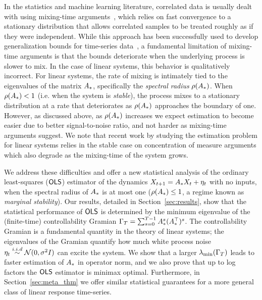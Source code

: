 In the statistics and machine learning literature, correlated data is usually
dealt with using mixing-time arguments~\citep{yu94}, which relies
on fast convergence to a stationary distribution that
allows correlated
samples to be treated roughly as if they were independent.  While this approach has
been successfully used to develop generalization bounds for time-series
data~\citep{mohri07}, a fundamental limitation of mixing-time arguments is that
the bounds deteriorate when the underlying process is slower to mix. 
%
In the case of linear systems, this behavior is qualitatively incorrect.
%
For linear systems, the rate of mixing is intimately tied to 
the eigenvalues of the matrix $A_{*}$, specifically the \emph{spectral radius} $\rho(A_{*})$.
When $\rho(A_{*}) < 1$ (i.e. when the system is \emph{stable}), 
the process mixes to a stationary distribution at a rate that 
deteriorates as $\rho(A_{*})$ approaches the boundary of one.
%
However, as discussed above, as $\rho(A_{*})$ increases
we expect estimation to become easier 
due to better signal-to-noise ratio, and not harder as mixing-time arguments suggest. 
%
%
We note that recent work by \cite{faradonbeh17a} studying the estimation
problem for linear systems relies in the stable case
on concentration of measure arguments which also degrade as the mixing-time of the
system grows.
 
We address these difficulties and offer a new statistical analysis of the ordinary least-squares ($\mathsf{OLS }$) estimator  
of the dynamics $X_{t + 1} = A_{*} X_{t} + \eta_t$ with no inputs, when the spectral radius of $A_{*}$ is at most one ($\rho(A_{*}) \leq 1$, a regime known 
as \emph{marginal stability}). Our results, detailed in Section~\ref{sec:results}, show 
that the statistical performance of $\mathsf{OLS }$ is determined by the minimum eigenvalue of the (finite-time) controllability Gramian $\Gamma_T = \sum_{s = 0}^{T - 1}A_{*}^s(A_{*}^\top)^s$. The controllability Gramian is a fundamental quantity in the theory of linear systems; the eigenvalues of the Gramian quantify how much white process noise $\eta_t \overset{i.i.d}{\sim} \mathcal{N}(0,\sigma^2 I)$ can excite the system. We show that a larger $\lambda_{\min}(\Gamma_T)$ leads to faster estimation of $A_{*}$ in operator norm, and we also prove that up to log factors the $\mathsf{OLS }$ estimator is minimax optimal. Furthermore, in Section~\ref{sec:meta_thm} we offer similar statistical guarantees for a more general class of linear response time-series. 


    
      
